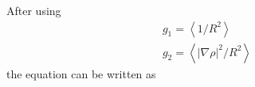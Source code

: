 After using
\begin{equation}
\begin{array}{*{20}{c}}
  {{g_1} = \left\langle {1/{R^2}} \right\rangle } \\ 
  {{g_2} = \left\langle {{{\left| {\nabla \rho } \right|}^2}/{R^2}} \right\rangle } 
\end{array}
\end{equation}
the equation can be written as

